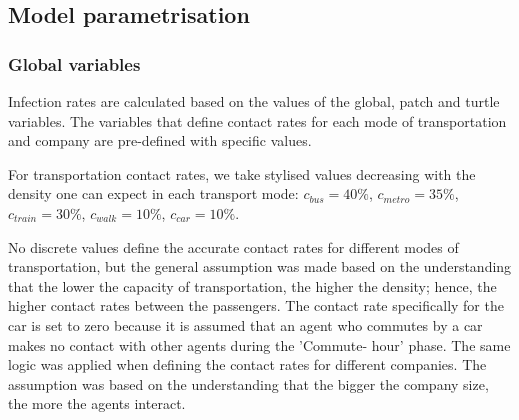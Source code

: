 \documentclass[smallextended]{svjour3}       %
\begin{document}



\subsection{Model parametrisation}

\subsubsection{Global variables}

Infection rates are calculated based on the values of the global, patch and turtle variables. The variables that define contact rates for each mode of transportation and company are pre-defined with specific values.

For transportation contact rates, we take stylised values decreasing with the density one can expect in each transport mode: $c_{bus} = 40\%$, $c_{metro} = 35\%$, $c_{train} = 30\%$, $c_{walk} = 10\%$, $c_{car} = 10\%$.

No discrete values define the accurate contact rates for different modes of transportation, but the general assumption was made based on the understanding that the lower the capacity of transportation, the higher the density; hence, the higher contact rates between the passengers. The contact rate specifically for the car is set to zero because it is assumed that an agent who commutes by a car makes no contact with other agents during the 'Commute- hour' phase. The same logic was applied when defining the contact rates for different companies. The assumption was based on the understanding that the bigger the company size, the more the agents interact.
\end{document}
